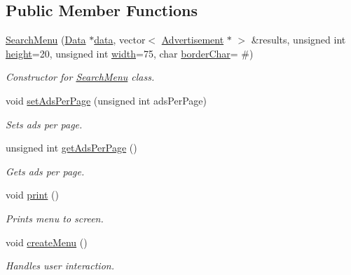 \subsection*{Public Member Functions}
\begin{DoxyCompactItemize}
\item 
\hyperlink{class_search_menu_ae0e28277ac4fea08c1f09b9fa502919f}{Search\+Menu} (\hyperlink{class_data}{Data} $\ast$\hyperlink{class_menu_a3914261df4f4fbadd9c0a854a5f42b0b}{data}, vector$<$ \hyperlink{class_advertisement}{Advertisement} $\ast$ $>$ \&results, unsigned int \hyperlink{class_menu_a84dd6e7e6b263601781683951687bf42}{height}=20, unsigned int \hyperlink{class_menu_a934c7679ed1575cc9924919b9b3eccb1}{width}=75, char \hyperlink{class_menu_a912c40f15f93092412c8d6204c0f8788}{border\+Char}= \textquotesingle{}\#\textquotesingle{})
\begin{DoxyCompactList}\small\item\em Constructor for \hyperlink{class_search_menu}{Search\+Menu} class. \end{DoxyCompactList}\item 
void \hyperlink{class_search_menu_a506fce847fc8201ccc63d3fbc2ede3b8}{set\+Ads\+Per\+Page} (unsigned int ads\+Per\+Page)
\begin{DoxyCompactList}\small\item\em Sets ads per page. \end{DoxyCompactList}\item 
unsigned int \hyperlink{class_search_menu_a39156ea5dcb600c0bf12eadc503f7268}{get\+Ads\+Per\+Page} ()
\begin{DoxyCompactList}\small\item\em Gets ads per page. \end{DoxyCompactList}\item 
\hypertarget{class_search_menu_a4fbc2741c5d72f4fe7473e5de5a5d14e}{}void \hyperlink{class_search_menu_a4fbc2741c5d72f4fe7473e5de5a5d14e}{print} ()\label{class_search_menu_a4fbc2741c5d72f4fe7473e5de5a5d14e}

\begin{DoxyCompactList}\small\item\em Prints menu to screen. \end{DoxyCompactList}\item 
\hypertarget{class_search_menu_a97f499b313e88142590aa51c2ef82f3d}{}void \hyperlink{class_search_menu_a97f499b313e88142590aa51c2ef82f3d}{create\+Menu} ()\label{class_search_menu_a97f499b313e88142590aa51c2ef82f3d}

\begin{DoxyCompactList}\small\item\em Handles user interaction. \end{DoxyCompactList}\end{DoxyCompactItemize}

